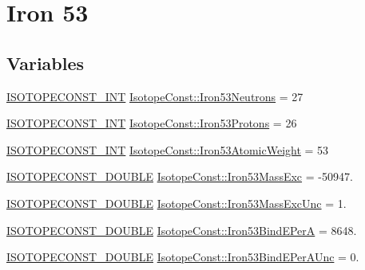 \hypertarget{group___isotope_const-_iron-_fe53}{}\section{Iron 53}
\label{group___isotope_const-_iron-_fe53}
\subsection*{Variables}
\begin{DoxyCompactItemize}
\item 
\mbox{\hyperlink{group___isotope_const-_macros_ga5f18360b3e99483a35c32d789e62621c}{I\+S\+O\+T\+O\+P\+E\+C\+O\+N\+S\+T\+\_\+\+I\+NT}} \mbox{\hyperlink{group___isotope_const-_iron-_fe53_ga98252c22bc5dbf9e12444a2b745c0ee1}{Isotope\+Const\+::\+Iron53\+Neutrons}} = 27
\item 
\mbox{\hyperlink{group___isotope_const-_macros_ga5f18360b3e99483a35c32d789e62621c}{I\+S\+O\+T\+O\+P\+E\+C\+O\+N\+S\+T\+\_\+\+I\+NT}} \mbox{\hyperlink{group___isotope_const-_iron-_fe53_gaf7b1c72882529f91d55953b6a13cb597}{Isotope\+Const\+::\+Iron53\+Protons}} = 26
\item 
\mbox{\hyperlink{group___isotope_const-_macros_ga5f18360b3e99483a35c32d789e62621c}{I\+S\+O\+T\+O\+P\+E\+C\+O\+N\+S\+T\+\_\+\+I\+NT}} \mbox{\hyperlink{group___isotope_const-_iron-_fe53_ga747a9d7a27e3813bbc4296f4eea2a745}{Isotope\+Const\+::\+Iron53\+Atomic\+Weight}} = 53
\item 
\mbox{\hyperlink{group___isotope_const-_macros_ga8f45a7272ce02c0b4c65c44636ed719a}{I\+S\+O\+T\+O\+P\+E\+C\+O\+N\+S\+T\+\_\+\+D\+O\+U\+B\+LE}} \mbox{\hyperlink{group___isotope_const-_iron-_fe53_gaefd55c518ecf69aa0fd2adb29cdfa2c0}{Isotope\+Const\+::\+Iron53\+Mass\+Exc}} = -\/50947.
\item 
\mbox{\hyperlink{group___isotope_const-_macros_ga8f45a7272ce02c0b4c65c44636ed719a}{I\+S\+O\+T\+O\+P\+E\+C\+O\+N\+S\+T\+\_\+\+D\+O\+U\+B\+LE}} \mbox{\hyperlink{group___isotope_const-_iron-_fe53_ga42d9b83aa66e4f786ac8c43cd116bca7}{Isotope\+Const\+::\+Iron53\+Mass\+Exc\+Unc}} = 1.
\item 
\mbox{\hyperlink{group___isotope_const-_macros_ga8f45a7272ce02c0b4c65c44636ed719a}{I\+S\+O\+T\+O\+P\+E\+C\+O\+N\+S\+T\+\_\+\+D\+O\+U\+B\+LE}} \mbox{\hyperlink{group___isotope_const-_iron-_fe53_ga5fb3384d3c45a99bc5b046f1e07a08bc}{Isotope\+Const\+::\+Iron53\+Bind\+E\+PerA}} = 8648.
\item 
\mbox{\hyperlink{group___isotope_const-_macros_ga8f45a7272ce02c0b4c65c44636ed719a}{I\+S\+O\+T\+O\+P\+E\+C\+O\+N\+S\+T\+\_\+\+D\+O\+U\+B\+LE}} \mbox{\hyperlink{group___isotope_const-_iron-_fe53_ga9aea6d5a48537c3c7c055f923e09897f}{Isotope\+Const\+::\+Iron53\+Bind\+E\+Per\+A\+Unc}} = 0.

\end{DoxyCompactItemize}
